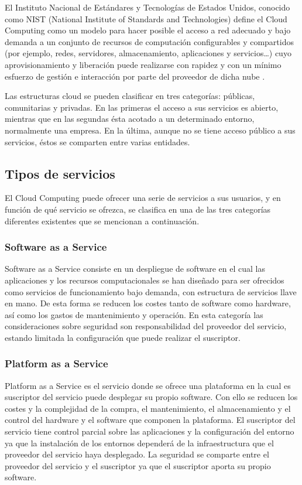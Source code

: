 El Instituto Nacional de Estándares y Tecnologías de Estados Unidos, conocido como NIST (National Institute of Standards and Technologies) define el Cloud Computing como un modelo para hacer posible el acceso a red adecuado y bajo demanda a un conjunto de recursos de computación configurables y compartidos (por ejemplo, redes, servidores, almacenamiento, aplicaciones y servicios…) cuyo aprovisionamiento y liberación puede realizarse con rapidez y con un mínimo esfuerzo de gestión e interacción por parte del proveedor de dicha nube \cite{inteco-cloud}.

Las estructuras cloud se pueden clasificar en tres categorías: públicas, comunitarias y privadas. En las primeras el acceso a sus servicios es abierto, mientras que en las segundas ésta acotado a un determinado entorno, normalmente una empresa. En la última, aunque no se tiene acceso público a sus servicios, éstos se comparten entre varias entidades.

\subsection{Tipos de servicios}

El Cloud Computing puede ofrecer una serie de servicios a sus usuarios, y en función de qué servicio se ofrezca, se clasifica en una de las tres categorías diferentes existentes que se mencionan a continuación.

\subsubsection{Software as a Service}

Software as a Service consiste en un despliegue de software en el cual las aplicaciones y los recursos computacionales se han diseñado para ser ofrecidos como servicios de funcionamiento bajo demanda, con estructura de servicios llave en mano. De esta forma se reducen los costes tanto de software como hardware, así como los gastos de mantenimiento y operación. En esta categoría las consideraciones sobre seguridad son responsabilidad del proveedor del servicio, estando limitada la configuración que puede realizar el suscriptor.

\subsubsection{Platform as a Service}

Platform as a Service es el servicio donde se ofrece una plataforma en la cual es suscriptor del servicio puede desplegar su propio software. Con ello se reducen los costes y la complejidad de la compra, el mantenimiento, el almacenamiento y el control del hardware y el software que componen la plataforma. El suscriptor del servicio tiene control parcial sobre las aplicaciones y la configuración del entorno ya que la instalación de los entornos dependerá de la infraestructura que el proveedor del servicio haya desplegado. La seguridad se comparte entre el proveedor del servicio y el suscriptor ya que el suscriptor aporta su propio software.

